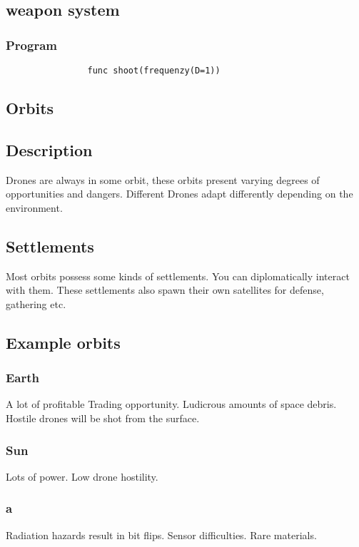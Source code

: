 \documentclass[a4paper]{scrreprt}
\begin{document}
    \section{weapon system}
        \subsection{Program}
            \begin{verbatim}
                func shoot(frequenzy(D=1))
            \end{verbatim}
        
\begin{alpha-feature}  
    \chapter{Orbits}
        \section{Description}
            Drones are always in some orbit, these orbits present varying degrees of opportunities and dangers.
            Different Drones adapt differently depending on the environment. 
        \section{Settlements}
            Most orbits possess some kinds of settlements. You can diplomatically interact with them. These settlements also spawn their own satellites for defense, gathering etc.
        \section{Example orbits}
            \subsection{Earth}
                A lot of profitable Trading opportunity.
                Ludicrous amounts of space debris.
                Hostile drones will be shot from the surface.
            \subsection{Sun}
                Lots of power.
                Low drone hostility. 
            \subsection{a}
                Radiation hazards result in bit flips.
                Sensor difficulties.
                Rare materials.

\end{alpha-feature}
\end{document}
